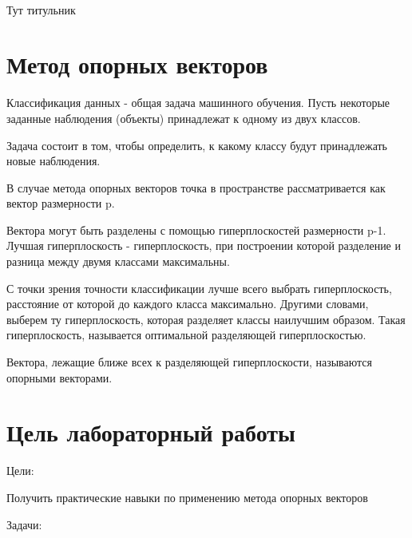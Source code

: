 \documentclass[a4paper,12pt]{article}
\begin{document}
\begin{titlepage}
\newpage

\

Тут титульник
\end{titlepage}

\newpage
\tableofcontents
\setcounter{page}{2}



\newpage\section{Метод опорных векторов} 
	Классификация данных - общая задача машинного обучения. Пусть некоторые заданные наблюдения (объекты) принадлежат к одному из двух классов. 

	\vspace{0.5cm}
	Задача состоит в том, чтобы определить, к какому классу будут принадлежать новые наблюдения. 

	\vspace{0.5cm}
	В случае метода опорных векторов точка в пространстве рассматривается как вектор размерности p. 

	\vspace{0.5cm}
	Вектора могут быть разделены с помощью гиперплоскостей размерности p-1. Лучшая гиперплоскость - гиперплоскость, при построении которой разделение и разница между двумя классами максимальны. 
	
	\vspace{0.5cm}
	С точки зрения точности классификации лучше всего выбрать гиперплоскость, расстояние от которой до каждого класса максимально. Другими словами, выберем ту гиперплоскость, которая разделяет классы наилучшим образом. Такая гиперплоскость, называется оптимальной разделяющей гиперплоскостью.
	
	\vspace{0.5cm}
	Вектора, лежащие ближе всех к разделяющей гиперплоскости, называются опорными векторами.
	
	
	
\newpage\section{Цель лабораторный работы} 
	Цели: 
	\vspace{0.5cm}
	
	Получить практические навыки по применению метода опорных векторов
	
	\vspace{0.5cm}
	Задачи: 
	
\end{document}
